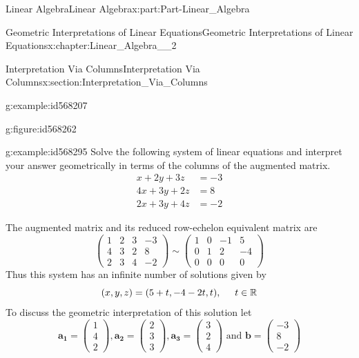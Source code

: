 \documentclass[oneside,10pt,]{book}
\numberwithin{equation}{section}
\newcommand{\amp}{&}
\begin{document}
\begin{partptx}{Linear Algebra}{}{Linear Algebra}{}{}{x:part:Part-Linear_Algebra}
\begin{chapterptx}{Geometric Interpretations of Linear Equations}{}{Geometric Interpretations of Linear Equations}{}{}{x:chapter:Linear_Algebra__2}
\begin{sectionptx}{Interpretation Via Columns}{}{Interpretation Via Columns}{}{}{x:section:Interpretation_Via_Columns}
\begin{example}{}{g:example:id568207}
\begin{figureptx}{}{g:figure:id568262}{}
\begin{image}{0.2}{0.6}{0.2}
\end{image}%
\tcblower
\end{figureptx}%
%
\end{example}
\begin{example}{}{g:example:id568295}%
Solve the following system of linear equations and interpret your answer geometrically in terms of the columns of the augmented matrix.%
\begin{align*}
x+2y+3z \amp=-3\\
4x+3y+2z \amp=8\\
2x+3y+4z \amp=-2
\end{align*}
%
\par\smallskip%
\noindent\hypertarget{g:solution:id568270}{}The augmented matrix and its reduced row-echelon equivalent matrix are%
\begin{equation*}
\begin{pmatrix} 1 \amp 2 \amp 3 \amp -3 \\ 4 \amp 3 \amp 2 \amp 8 \\ 2 \amp 3 \amp 4 \amp -2 \end{pmatrix} \sim \begin{pmatrix} 1 \amp 0 \amp -1 \amp 5 \\ 0 \amp 1 \amp 2 \amp -4 \\ 0 \amp 0 \amp 0 \amp 0 \end{pmatrix} 
\end{equation*}
Thus this system has an infinite number of solutions given by%
\begin{equation*}
(x,y,z)=(5+t,-4-2t,t), \hspace{5mm} t\in\mathbb{R}
\end{equation*}
To discuss the geometric interpretation of this solution let%
\begin{equation*}
\mathbf{a_1}=\begin{pmatrix} 1 \\ 4 \\ 2 \end{pmatrix}, \mathbf{a_2}=\begin{pmatrix} 2 \\ 3 \\ 3 \end{pmatrix}, \mathbf{a_3}=\begin{pmatrix} 3 \\ 2 \\ 4 \end{pmatrix} \textrm{ and } \mathbf{b}=\begin{pmatrix} -3 \\ 8 \\ -2 \end{pmatrix}

\end{equation*}
\end{example}
\end{sectionptx}
\end{chapterptx}
\end{partptx}
\end{document}
